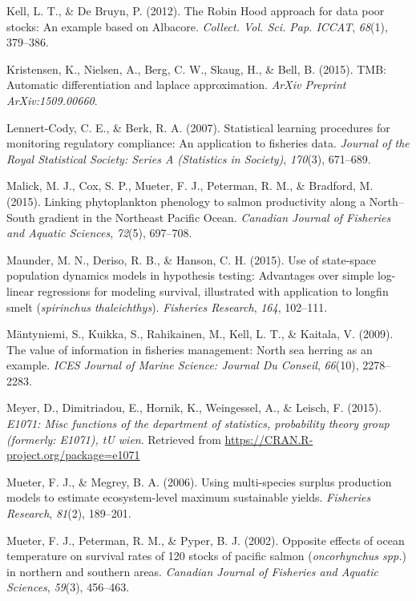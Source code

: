 \documentclass[12pt,]{scrartcl}
\begin{document}
\hypertarget{ref-kell2012robin}{}
Kell, L. T., \& De Bruyn, P. (2012). The Robin Hood approach for data
poor stocks: An example based on Albacore. \emph{Collect. Vol. Sci. Pap.
ICCAT}, \emph{68}(1), 379--386.

\hypertarget{ref-kristensen2015tmb}{}
Kristensen, K., Nielsen, A., Berg, C. W., Skaug, H., \& Bell, B. (2015).
TMB: Automatic differentiation and laplace approximation. \emph{ArXiv
Preprint ArXiv:1509.00660}.

\hypertarget{ref-lennert2007statistical}{}
Lennert-Cody, C. E., \& Berk, R. A. (2007). Statistical learning
procedures for monitoring regulatory compliance: An application to
fisheries data. \emph{Journal of the Royal Statistical Society: Series A
(Statistics in Society)}, \emph{170}(3), 671--689.

\hypertarget{ref-malick2015linking}{}
Malick, M. J., Cox, S. P., Mueter, F. J., Peterman, R. M., \& Bradford,
M. (2015). Linking phytoplankton phenology to salmon productivity along
a North--South gradient in the Northeast Pacific Ocean. \emph{Canadian
Journal of Fisheries and Aquatic Sciences}, \emph{72}(5), 697--708.

\hypertarget{ref-maunder2015use}{}
Maunder, M. N., Deriso, R. B., \& Hanson, C. H. (2015). Use of
state-space population dynamics models in hypothesis testing: Advantages
over simple log-linear regressions for modeling survival, illustrated
with application to longfin smelt (\emph{spirinchus thaleichthys}).
\emph{Fisheries Research}, \emph{164}, 102--111.

\hypertarget{ref-mantyniemi2009value}{}
Mäntyniemi, S., Kuikka, S., Rahikainen, M., Kell, L. T., \& Kaitala, V.
(2009). The value of information in fisheries management: North sea
herring as an example. \emph{ICES Journal of Marine Science: Journal Du
Conseil}, \emph{66}(10), 2278--2283.

\hypertarget{ref-meyer2015e1071}{}
Meyer, D., Dimitriadou, E., Hornik, K., Weingessel, A., \& Leisch, F.
(2015). \emph{E1071: Misc functions of the department of statistics,
probability theory group (formerly: E1071), tU wien}. Retrieved from
\url{https://CRAN.R-project.org/package=e1071}

\hypertarget{ref-mueter2006using}{}
Mueter, F. J., \& Megrey, B. A. (2006). Using multi-species surplus
production models to estimate ecosystem-level maximum sustainable
yields. \emph{Fisheries Research}, \emph{81}(2), 189--201.

\hypertarget{ref-mueter2002opposite}{}
Mueter, F. J., Peterman, R. M., \& Pyper, B. J. (2002). Opposite effects
of ocean temperature on survival rates of 120 stocks of pacific salmon
(\emph{oncorhynchus spp.}) in northern and southern areas.
\emph{Canadian Journal of Fisheries and Aquatic Sciences}, \emph{59}(3),
456--463.
\end{document}
